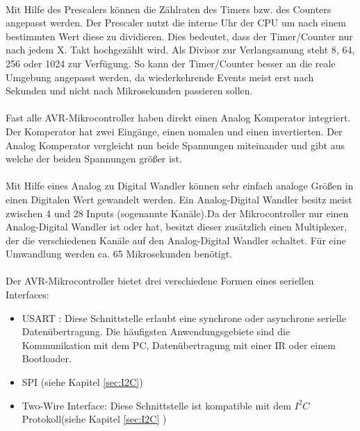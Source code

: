 \paragraph{}
Mit Hilfe des Prescalers können die Zählraten des Timers bzw. des Counters angepasst werden. Der Prescaler nutzt die interne Uhr der CPU um nach einem bestimmten Wert diese zu dividieren. Dies bedeutet, dass der Timer/Counter nur nach jedem X. Takt hochgezählt wird. Als Divisor zur Verlangsamung steht 8, 64, 256 oder 1024 zur Verfügung. So kann der Timer/Counter besser an die reale Umgebung angepasst werden, da wiederkehrende Events meist erst nach Sekunden  und nicht nach Mikrosekunden passieren sollen. 
\paragraph{}
Fast alle AVR-Mikrocontroller haben direkt einen Analog Komperator integriert. Der Komperator hat zwei Eingänge, einen nomalen und einen invertierten. Der Analog Komperator vergleicht nun beide Spannungen miteinander und gibt aus welche der beiden Spannungen größer ist.
\paragraph{}
Mit Hilfe eines Analog zu Digital Wandler können sehr einfach analoge Größen in einen Digitalen Wert gewandelt werden. Ein Analog-Digital Wandler besitz meist zwischen 4 und 28 Inputs (sogenannte Kanäle).Da der Mikrocontroller nur einen Analog-Digital Wandler ist oder hat, besitzt dieser zusätzlich einen Multiplexer, der die verschiedenen Kanäle auf den Analog-Digital Wandler schaltet. Für eine Umwandlung werden ca. 65 Mikrosekunden benötigt.
\paragraph{}
Der AVR-Mikrocontroller bietet drei verschiedene Formen eines seriellen Interfaces: 
\begin{itemize}
\item \ac{USART} : Diese Schnittstelle erlaubt eine synchrone oder asynchrone serielle Datenübertragung. Die häufigsten Anwendungsgebiete sind die Kommunikation mit dem PC, Datenübertragung mit einer IR oder einem Bootloader.
\item \ac{SPI} (siehe Kapitel \ref{sec:I2C})
\item Two-Wire Interface: Diese Schnittstelle ist kompatible  mit dem $I^{2}C$ Protokoll(siehe Kapitel \ref{sec:I2C} )
\end{itemize}
